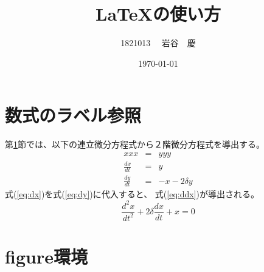 \documentclass[12pt,a4j,twocolumn]{jarticle}
\title{LaTeXの使い方}
\author{1821013 　岩谷　慶}
\date{\today}
\begin{document}
\maketitle


\section{数式のラベル参照}\label{sec_label}
第\ref{sec_label}節では、以下の連立微分方程式から２階微分方程式を導出する。
%
\begin{eqnarray}
  \label{eq:x}
  xxx & = & yyy \\
	\label{eq:dx}
	\frac{dx}{dt} & = & y \\
	\label{eq:dy}
	\frac{dy}{dt} & = & - x - 2 \delta y 
\end{eqnarray}
%
式(\ref{eq:dx})を式(\ref{eq:dy})に代入すると、
式(\ref{eq:ddx})が導出される。
%
\begin{equation}
	\label{eq:ddx}
	\frac{d^2x}{dt^2} + 2 \delta \frac{dx}{dt} + x = 0
\end{equation}

\newpage

\section{figure環境}
\end{document}
